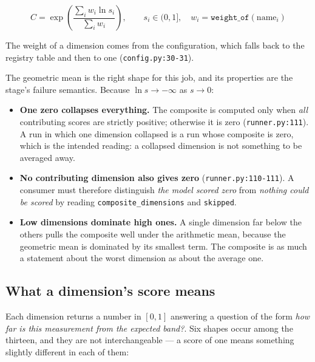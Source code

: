 \documentclass[11pt,a4paper]{article}
\newcommand{\code}[1]{\texttt{#1}}
\begin{document}
\begin{equation}
C = \exp\!\left( \frac{ \sum_i w_i \ln s_i }{ \sum_i w_i } \right),
\qquad s_i \in (0,1],
\quad w_i = \texttt{weight\_of}(\text{name}_i)
\end{equation}

The weight of a dimension comes from the configuration, which falls back to
the registry table and then to one (\code{config.py:30-31}).

The geometric mean is the right shape for this job, and its properties are
the stage's failure semantics. Because $\ln s \to -\infty$ as $s \to 0$:

\begin{itemize}
\item \textbf{One zero collapses everything.} The composite is computed only
      when \emph{all} contributing scores are strictly positive; otherwise it
      is zero (\code{runner.py:111}). A run in which one dimension collapsed
      is a run whose composite is zero, which is the intended reading: a
      collapsed dimension is not something to be averaged away.
\item \textbf{No contributing dimension also gives zero}
      (\code{runner.py:110-111}). A consumer must therefore distinguish
      \emph{the model scored zero} from \emph{nothing could be scored} by
      reading \code{composite\_dimensions} and \code{skipped}.
\item \textbf{Low dimensions dominate high ones.} A single dimension far
      below the others pulls the composite well under the arithmetic mean,
      because the geometric mean is dominated by its smallest term. The
      composite is as much a statement about the worst dimension as about
      the average one.
\end{itemize}

\subsection{What a dimension's score means}

Each dimension returns a number in $[0,1]$ answering a question of the form
\emph{how far is this measurement from the expected band?}. Six shapes
occur among the thirteen, and they are not interchangeable --- a score of
one means something slightly different in each of them:
\end{document}
